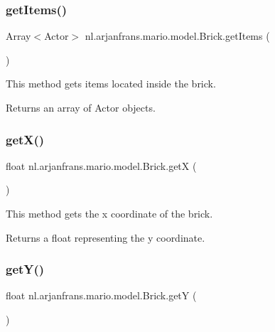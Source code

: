 \subsubsection{\texorpdfstring{get\+Items()}{getItems()}}
{\footnotesize\ttfamily Array$<$Actor$>$ nl.\+arjanfrans.\+mario.\+model.\+Brick.\+get\+Items (\begin{DoxyParamCaption}{ }\end{DoxyParamCaption})}



This method gets items located inside the brick. 

\begin{DoxyReturn}{Returns}
an array of Actor objects. 
\end{DoxyReturn}
\mbox{\label{classnl_1_1arjanfrans_1_1mario_1_1model_1_1Brick_a423a5d8853e99442315e102408f3e0ec}} 
\subsubsection{\texorpdfstring{get\+X()}{getX()}}
{\footnotesize\ttfamily float nl.\+arjanfrans.\+mario.\+model.\+Brick.\+getX (\begin{DoxyParamCaption}{ }\end{DoxyParamCaption})}



This method gets the x coordinate of the brick. 

\begin{DoxyReturn}{Returns}
a float representing the y coordinate. 
\end{DoxyReturn}
\mbox{\label{classnl_1_1arjanfrans_1_1mario_1_1model_1_1Brick_afc049458a63d92b001328afe8714c2f8}} 
\subsubsection{\texorpdfstring{get\+Y()}{getY()}}
{\footnotesize\ttfamily float nl.\+arjanfrans.\+mario.\+model.\+Brick.\+getY (\begin{DoxyParamCaption}{ }\end{DoxyParamCaption})}



